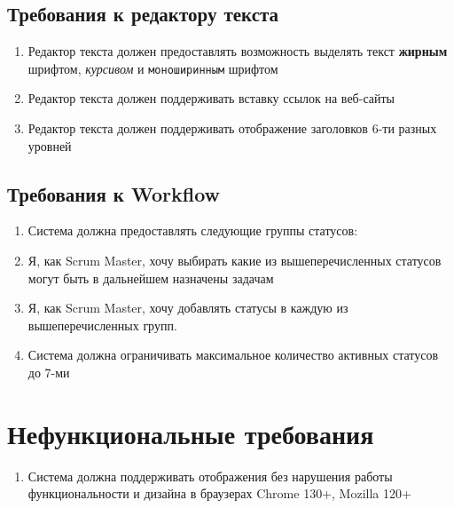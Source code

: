 \subsection{Требования к редактору текста}
\begin{enumerate}[label=\textbf{AER\arabic*}.]
  \item Редактор текста должен предоставлять возможность выделять текст
        \textbf{жирным} шрифтом, \textit{курсивом} и \texttt{моноширинным} шрифтом
  \item Редактор текста должен поддерживать вставку ссылок на веб-сайты
  \item Редактор текста должен поддерживать отображение заголовков 6-ти разных
        уровней
\end{enumerate}

\subsection{Требования к Workflow}
\begin{enumerate}[label=\textbf{WFR\arabic*}.]
  \item Система должна предоставлять следующие группы статусов:
         \item Я,
        как Scrum Master, хочу выбирать какие из вышеперечисленных статусов могут быть
        в дальнейшем назначены задачам \item Я, как Scrum Master, хочу добавлять
        статусы в каждую из вышеперечисленных групп.
  \item Система должна ограничивать максимальное количество активных статусов до 7-ми
\end{enumerate}


\section{Нефункциональные требования}
\begin{enumerate}[label=\textbf{NFR\arabic*}.]
  \item Система должна поддерживать отображения без нарушения работы функциональности
        и дизайна в браузерах Chrome 130+, Mozilla 120+
\end{enumerate}


